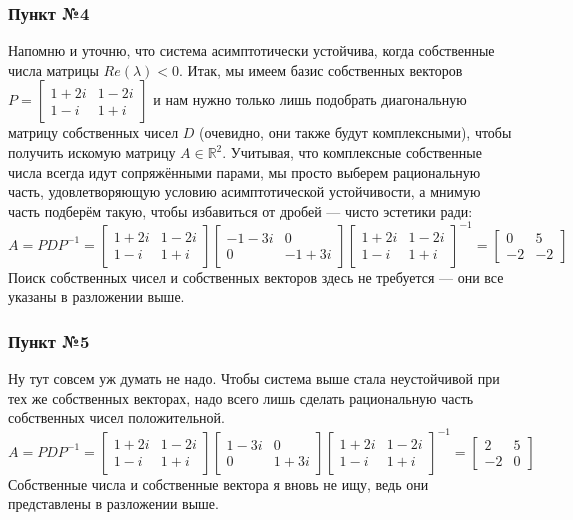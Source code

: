 \documentclass[a3paper,14pt]{extarticle}
\begin{document}
\subsubsection*{Пункт №4}
Напомню и уточню, что система асимптотически устойчива, когда собственные числа матрицы $Re(\lambda) < 0$. Итак, мы имеем базис собственных векторов $P=\left[\begin{smallmatrix}
    1+2i & 1-2i \\ 1-i & 1+i
\end{smallmatrix}\right]$ и нам нужно только лишь подобрать диагональную матрицу собственных чисел $D$ (очевидно, они также будут комплексными), чтобы получить искомую матрицу $A \in \mathbb{R}^2$. Учитывая, что комплексные собственные числа всегда идут сопряжёнными парами, мы просто выберем рациональную часть, удовлетворяющую условию асимптотической устойчивости, а мнимую часть подберём такую, чтобы избавиться от дробей --- чисто эстетики ради:
$$A = PDP^{-1} = \begin{bmatrix}
    1+2i & 1-2i \\ 1-i & 1+i
\end{bmatrix}\begin{bmatrix}
    -1-3i & 0 \\ 0 & -1+3i
\end{bmatrix}\begin{bmatrix}
    1+2i & 1-2i \\ 1-i & 1+i
\end{bmatrix}^{-1} = \begin{bmatrix}
    0 & 5 \\ -2 & -2
\end{bmatrix}$$
Поиск собственных чисел и собственных векторов здесь не требуется --- они все указаны в разложении выше. 
\subsubsection*{Пункт №5}
Ну тут совсем уж думать не надо. Чтобы система выше стала неустойчивой при тех же собственных векторах, надо всего лишь сделать рациональную часть собственных чисел положительной.
$$A = PDP^{-1} = \begin{bmatrix}
    1+2i & 1-2i \\ 1-i & 1+i
\end{bmatrix}\begin{bmatrix}
    1-3i & 0 \\ 0 & 1+3i
\end{bmatrix}\begin{bmatrix}
    1+2i & 1-2i \\ 1-i & 1+i
\end{bmatrix}^{-1} = \begin{bmatrix}
    2 & 5 \\ -2 & 0
\end{bmatrix}$$
Собственные числа и собственные вектора я вновь не ищу, ведь они представлены в разложении выше.
\end{document}
